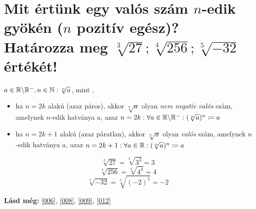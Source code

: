\section{Mit értünk egy valós szám \texorpdfstring{$n$}{n}-edik gyökén 
  (\texorpdfstring{$n$}{n} pozitív egész)? Határozza meg 
  \texorpdfstring{$\sqrt[3]{27}; \sqrt[4]{256}; \sqrt[5]{-32}$}
  {27**(1/3); 256**(1/4); -32**(1/5)} értékét!}
\label{013}

\begin{defin}
\label{def:nthroot}
$a \in \mathbb{R} \backslash \mathbb{R}^-, n \in \mathbb{N}: \sqrt[n]{a}$, mint
,
\begin{itemize}
  \item ha $n = 2k$ alakú (azaz páros), akkor $\sqrt[n]{a}$ olyan \emph{nem
    negatív valós} szám, amelynek $n$-edik hatványa $a$, azaz
    $n = 2k: \forall a \in \mathbb{R} \backslash \mathbb{R}^-: 
      (\sqrt[n]{a})^n \coloneqq a$
  \item ha $n = 2k+1$ alakú (azaz páratlan), akkor $\sqrt[n]{a}$ olyan 
    \emph{valós} szám, amelynek $n$-edik hatványa $a$, azaz
    $n = 2k + 1: \forall a \in \mathbb{R}: (\sqrt[n]{a})^n \coloneqq a$
\end{itemize}
\end{defin}

\[
  \sqrt[3]{27} = \sqrt[3]{3^3} = 3
\]
\[
  \sqrt[4]{256} = \sqrt[4]{4^4} = 4
\]
\[
  \sqrt[5]{-32} = \sqrt[5]{(-2)^5} = -2
\]

\textbf{Lásd még:} \ref{006}, \ref{008}, \ref{009}, \ref{012}